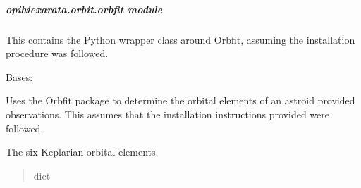 \documentclass[letterpaper,11pt,english]{sphinxmanual}
\begin{document}
\sphinxstepscope


\subparagraph{opihiexarata.orbit.orbfit module}
\label{\detokenize{code/opihiexarata.orbit.orbfit:module-opihiexarata.orbit.orbfit}}\label{\detokenize{code/opihiexarata.orbit.orbfit:opihiexarata-orbit-orbfit-module}}\label{\detokenize{code/opihiexarata.orbit.orbfit::doc}}
\sphinxAtStartPar
This contains the Python wrapper class around Orbfit, assuming the
installation procedure was followed.

\begin{savenotes}\begin{fulllineitems}
\label{\detokenize{code/opihiexarata.orbit.orbfit:opihiexarata.orbit.orbfit.OrbfitOrbitDeterminerEngine}}
\pysigstartsignatures
{}
\pysigstopsignatures
\sphinxAtStartPar
Bases: {\hyperref[\detokenize{code/opihiexarata.library.engine:opihiexarata.library.engine.OrbitEngine}]{}}

\sphinxAtStartPar
Uses the Orbfit package to determine the orbital elements of an astroid
provided observations. This assumes that the installation instructions
provided were followed.

\begin{savenotes}\begin{fulllineitems}
\label{\detokenize{code/opihiexarata.orbit.orbfit:opihiexarata.orbit.orbfit.OrbfitOrbitDeterminerEngine.orbital_elements}}
\pysigstartsignatures
{}
\pysigstopsignatures
\sphinxAtStartPar
The six Keplarian orbital elements.
\begin{quote}\begin{description}
\sphinxAtStartPar
dict

\end{description}\end{quote}


\end{fulllineitems}
\end{savenotes}
\end{fulllineitems}
\end{savenotes}
\end{document}

